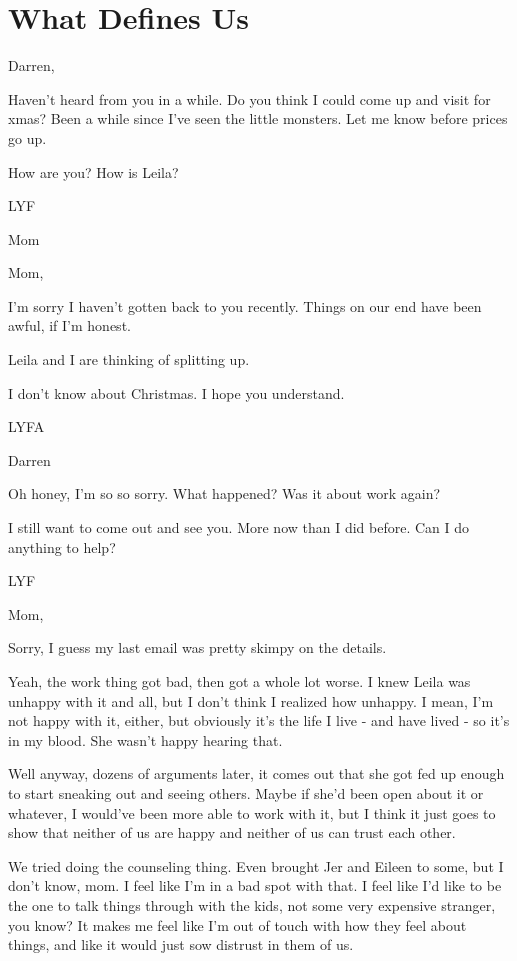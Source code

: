\hypertarget{what-defines-us}{%
\chapter{What Defines Us}\label{what-defines-us}}

Darren,

Haven't heard from you in a while. Do you think I could come up and visit for xmas? Been a while since I've seen the little monsters. Let me know before prices go up.

How are you? How is Leila?

LYF

Mom

\secdiv{}

\noindent Mom,

I'm sorry I haven't gotten back to you recently. Things on our end have been awful, if I'm honest.

Leila and I are thinking of splitting up.

I don't know about Christmas. I hope you understand.

LYFA

Darren

\secdiv{}

\noindent Oh honey, I'm so so sorry. What happened? Was it about work again?

I still want to come out and see you. More now than I did before. Can I do anything to help?

LYF

\secdiv{}

\noindent Mom,

Sorry, I guess my last email was pretty skimpy on the details.

Yeah, the work thing got bad, then got a whole lot worse. I knew Leila was unhappy with it and all, but I don't think I realized how unhappy. I mean, I'm not happy with it, either, but obviously it's the life I live - and have lived - so it's in my blood. She wasn't happy hearing that.

Well anyway, dozens of arguments later, it comes out that she got fed up enough to start sneaking out and seeing others. Maybe if she'd been open about it or whatever, I would've been more able to work with it, but I think it just goes to show that neither of us are happy and neither of us can trust each other.

We tried doing the counseling thing. Even brought Jer and Eileen to some, but I don't know, mom. I feel like I'm in a bad spot with that. I feel like I'd like to be the one to talk things through with the kids, not some very expensive stranger, you know? It makes me feel like I'm out of touch with how they feel about things, and like it would just sow distrust in them of us.

